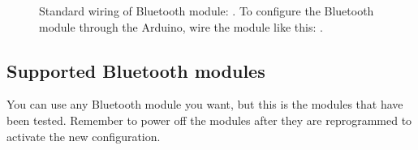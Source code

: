 		\begin{figure}[H]
		\hfill
		\caption{Standard wiring of Bluetooth module: \protect{\ref{fig:arduino_standard_wiring}}. To configure the Bluetooth module through the Arduino, wire the module like this: \protect{\ref{fig:arduino_configure_bluetooth}}.}
		\end{figure}

			\subsection{Supported Bluetooth modules}
			You can use any Bluetooth module you want, but this is the modules that have been tested. Remember to power off the modules after they are reprogrammed to activate the new configuration.\\
			
